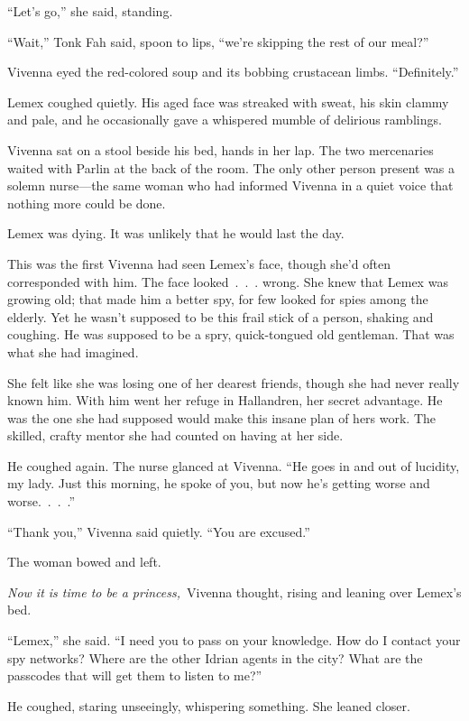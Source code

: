 “Let’s go,” she said, standing.

“Wait,” Tonk Fah said, spoon to lips, “we’re skipping the rest of our meal?”

Vivenna eyed the red-colored soup and its bobbing crustacean limbs. “Definitely.”

\orn

Lemex coughed quietly. His aged face was streaked with sweat, his skin clammy and pale, and he occasionally gave a whispered mumble of delirious ramblings.

Vivenna sat on a stool beside his bed, hands in her lap. The two mercenaries waited with Parlin at the back of the room. The only other person present was a solemn nurse—the same woman who had informed Vivenna in a quiet voice that nothing more could be done.

Lemex was dying. It was unlikely that he would last the day.

This was the first Vivenna had seen Lemex’s face, though she’d often corresponded with him. The face looked~.~.~. wrong. She knew that Lemex was growing old; that made him a better spy, for few looked for spies among the elderly. Yet he wasn’t supposed to be this frail stick of a person, shaking and coughing. He was supposed to be a spry, quick-tongued old gentleman. That was what she had imagined.

She felt like she was losing one of her dearest friends, though she had never really known him. With him went her refuge in Hallandren, her secret advantage. He was the one she had supposed would make this insane plan of hers work. The skilled, crafty mentor she had counted on having at her side.

He coughed again. The nurse glanced at Vivenna. “He goes in and out of lucidity, my lady. Just this morning, he spoke of you, but now he’s getting worse and worse.~.~.~.”

“Thank you,” Vivenna said quietly. “You are excused.”

The woman bowed and left.

\textit{Now it is time to be a princess,}~Vivenna thought, rising and leaning over Lemex’s bed.

“Lemex,” she said. “I need you to pass on your knowledge. How do I contact your spy networks? Where are the other Idrian agents in the city? What are the passcodes that will get them to listen to me?”

He coughed, staring unseeingly, whispering something. She leaned closer.

